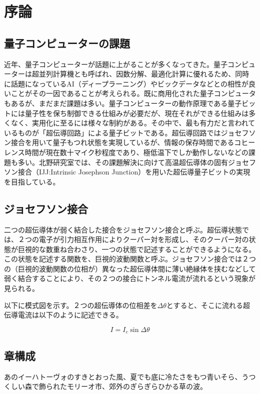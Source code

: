 \chapter{序論}
\section{量子コンピューターの課題}
近年、量子コンピューターが話題に上がることが多くなってきた。量子コンピューターは超並列計算機とも呼ばれ、因数分解、最適化計算に優れるため、同時に話題になっているAI（ディープラーニング）やビックデータなどとの相性が良いことがその一因であることが考えられる。既に商用化された量子コンピュータもあるが、まだまだ課題は多い。量子コンピューターの動作原理である量子ビットには量子性を保ち制御できる仕組みが必要だが、現在それができる仕組みは多くなく、実用化に至るには様々な制約がある。その中で、最も有力だと言われているものが「超伝導回路」による量子ビットである。超伝導回路ではジョセフソン接合を用いて量子もつれ状態を実現しているが、情報の保存時間であるコヒーレンス時間が現在数十マイク秒程度であり、極低温下でしか動作しないなどの課題も多い。北野研究室では、その課題解決に向けて高温超伝導体の固有ジョセフソン接合（IJJ:Intrinsic Josephson Junction）を用いた超伝導量子ビットの実現を目指している。

\section{ジョセフソン接合}
二つの超伝導体が弱く結合した接合をジョセフソン接合と呼ぶ。超伝導状態では、２つの電子が引力相互作用によりクーパー対を形成し、そのクーパー対の状態が巨視的な数重ね合わさり、一つの状態で記述することができるようになる。この状態を記述する関数を、巨視的波動関数と呼ぶ。ジョセフソン接合では２つの（巨視的波動関数の位相が）異なった超伝導体間に薄い絶縁体を挟むなどして弱く結合することにより、その２つの接合にトンネル電流が流れるという現象が見られる。

以下に模式図を示す。２つの超伝導体の位相差を$ \Delta \theta $とすると、そこに流れる超伝導電流は以下のように記述できる。

\[ I = I_c \sin{\Delta \theta } \]




\section{章構成}
あのイーハトーヴォのすきとおった風、夏でも底に冷たさをもつ青いそら、うつくしい森で飾られたモリーオ市、郊外のぎらぎらひかる草の波。
